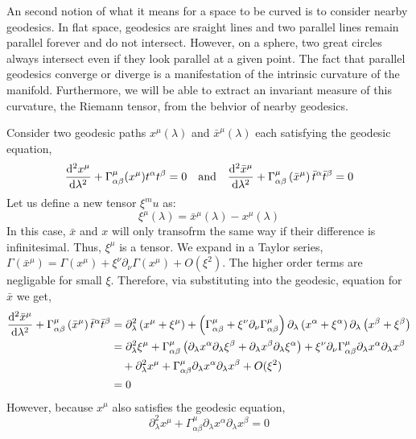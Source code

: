 \documentclass[11pt, a4paper]{article}
\begin{document}
An second notion of what it means for a space to be curved is to consider nearby geodesics. In flat space, geodesics are sraight lines and two parallel lines remain parallel forever and do not intersect. However, on a sphere, two great circles always intersect even if they look parallel at a given point. The fact that parallel geodesics converge or diverge is a manifestation of the intrinsic curvature of the manifold. Furthermore, we will be able to extract an invariant measure of this curvature, the Riemann tensor, from the behvior of nearby geodesics.
\par 
Consider two geodesic paths $x^\mu(\lambda)$ and $\bar{x}^{\mu}(\lambda)$ each satisfying the geodesic equation, 
\[ \frac{\mathrm{d}^{2} x^\mu}{\mathrm{d}\lambda^{2}} +  \Gamma^\mu_{\alpha\beta}(x^\mu) t^\alpha t^\beta = 0 \quad \text{and} \quad  \frac{\mathrm{d}^{2} \bar{x}^\mu}{\mathrm{d}\lambda^{2}} + \Gamma^\mu_{\alpha\beta}\left(\bar{x}^\mu\right)\bar{t}^\alpha\bar{t}^\beta = 0\]
Let us define a new tensor $\xi^mu$ as:
\[\xi^\mu(\lambda) = \bar{x}^\mu(\lambda) -x^\mu(\lambda)\]
In this case, $\bar x$ and $x$ will only transofrm the same way if their difference is infinitesimal.  Thus, $\xi^\mu$ is a tensor.
We expand in a Taylor series, $\Gamma\left(\bar{x}^\mu\right) = \Gamma(x^\mu) + \xi^\nu \partial_\nu \Gamma(x^\mu) + O(\xi^2)$. The higher order terms are negligable for small $\xi$. Therefore, via substituting into the geodesic, equation for $\bar{x}$ we get,
\begin{align*}
\frac{\mathrm{d}^{2} \bar{x}^\mu}{\mathrm{d}\lambda^{2}} + \Gamma^\mu_{\alpha\beta}\left(\bar{x}^\mu\right)\bar{t}^\alpha\bar{t}^\beta 
&  = \partial_\lambda^2 \left(x^\mu + \xi^\mu\right) + \left(\Gamma^\mu_{\alpha\beta}+\xi^\nu \partial_\nu \Gamma^\mu_{\alpha\beta}\right) \partial_\lambda\left(x^\alpha + \xi^\alpha\right)\partial_\lambda\left(x^\beta + \xi^\beta\right)
\\
& = \partial_\lambda^2 \xi^\mu + \Gamma^\mu_{\alpha\beta}\left(\partial_\lambda x^\alpha \partial_\lambda \xi^\beta + \partial_\lambda x^\beta \partial_\lambda \xi^\alpha\right) + \xi^\nu \partial_\nu\Gamma^\mu_{\alpha\beta} \partial_\lambda x^\alpha \partial_\lambda x^\beta
\\
& \quad + \partial_\lambda^2 x^\mu  + \Gamma^\mu_{\alpha\beta} \partial_\lambda x^\alpha \partial_\lambda x^\beta + O(\xi^2)
\\
& = 0
\end{align*}
However, because $x^\mu$ also satisfies the geodesic equation,
\[ \partial_\lambda^2 x^\mu + \Gamma_{\alpha \beta}^\mu \partial_\lambda x^\alpha \partial_\lambda x^\beta = 0\]
\end{document}
